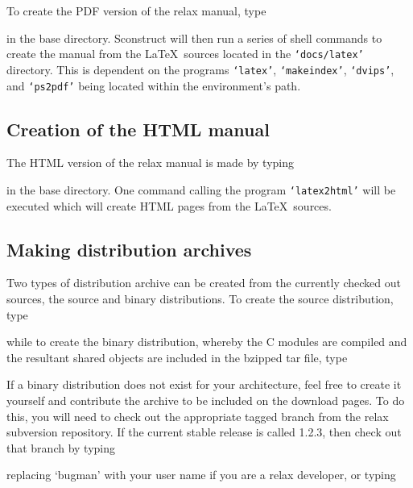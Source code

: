 To create the PDF version of the relax manual, type


in the base directory.  Sconstruct will then run a series of shell commands to create the manual from the \LaTeX\ sources located in the \texttt{`docs/latex'} directory.  This is dependent on the programs \texttt{`latex'}, \texttt{`makeindex'}, \texttt{`dvips'}, and \texttt{`ps2pdf'} being located within the environment's path.


\subsection{Creation of the HTML manual}

The HTML version of the relax manual is made by typing


in the base directory.  One command calling the program \texttt{`latex2html'} will be executed which will create HTML pages from the \LaTeX\ sources.


\subsection{Making distribution archives}

Two types of distribution archive can be created from the currently checked out sources, the source and binary distributions.  To create the source distribution, type 


while to create the binary distribution, whereby the C modules are compiled and the resultant shared objects are included in the bzipped tar file, type


If a binary distribution does not exist for your architecture, feel free to create it yourself and contribute the archive to be included on the download pages.  To do this, you will need to check out the appropriate tagged branch from the relax subversion repository.  If the current stable release is called 1.2.3, then check out that branch by typing


replacing `bugman' with your user name if you are a relax developer, or typing

